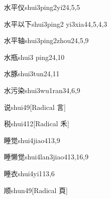 \begin{verbete}{水平仪}{shui3ping2yi2}{4,5,5}
\end{verbete}

\begin{verbete}{水平以下}{shui3ping2 yi3xia4}{4,5,4,3}
\end{verbete}

\begin{verbete}{水平轴}{shui3ping2zhou2}{4,5,9}
\end{verbete}

\begin{verbete}{水瓶}{shui3 ping2}{4,10}
\end{verbete}

\begin{verbete}{水豚}{shui3tun2}{4,11}
\end{verbete}

\begin{verbete}{水污染}{shui3wu1ran3}{4,6,9}
\end{verbete}

\begin{verbete}{说}{shui4}{9}[Radical 言]
\end{verbete}

\begin{verbete}{税}{shui4}{12}[Radical 禾]
\end{verbete}

\begin{verbete}{睡觉}{shui4jiao4}{13,9}
\end{verbete}

\begin{verbete}{睡懒觉}{shui4lan3jiao4}{13,16,9}
\end{verbete}

\begin{verbete}{睡衣}{shui4yi1}{13,6}
\end{verbete}

\begin{verbete}{顺}{shun4}{9}[Radical 頁]
\end{verbete}

